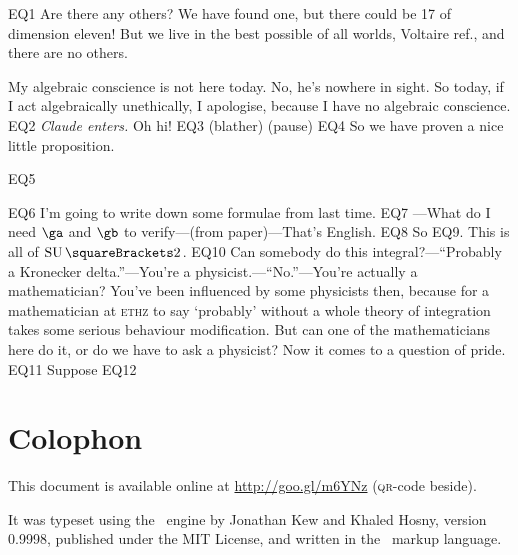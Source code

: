 \documentclass[10pt, a4paper, twoside]{lecturenotes}
\begin{document}
\NewLecture[date=2013-05-23]
EQ1
Are there any others? We have found one, but there could be 17 of dimension eleven! But we live in the best possible of all worlds, Voltaire ref., and there are no others.

My algebraic conscience is not here today. No, he's nowhere in sight. So today, if I act algebraically unethically, I apologise, because I have no algebraic conscience.
EQ2
\emph{Claude enters.} Oh hi!
EQ3
(blather)
(pause)
EQ4
So we have proven a nice little proposition.
\begin{proposition}
EQ5
\end{proposition}
EQ6
I'm going to write down some formulae from last time.
EQ7
---What do I need $\ga$ and $\gb$ to verify---(from paper)---That's English.  %
EQ8
So EQ9. This is all of $\SpecialUnitaryGroup\of 2$.
EQ10
Can somebody do this integral?---``Probably a Kronecker delta.''---You're a physicist.---``No.''---You're actually a mathematician? You've been influenced by some physicists then, because for a mathematician at \textsc{ethz} to say `probably' without a whole theory of integration takes some serious behaviour modification. But can one of the mathematicians here do it, or do we have to ask a physicist? Now it comes to a question of pride.
EQ11
Suppose EQ12
\endgroup%

\appendix
\newpage
\section*{Colophon}
This document is available online at \url{http://goo.gl/m6YNz} (\textsc{qr}-code beside).

It was typeset using the \XeTeX\ engine by Jonathan Kew and Khaled Hosny, version 0.9998, published under the MIT
License, and written in the \XeLaTeX\ markup language.
\end{document}
